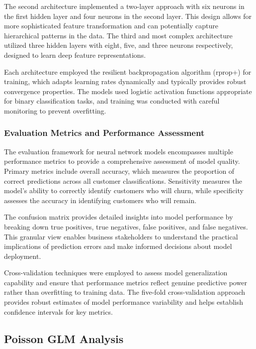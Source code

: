 \documentclass[
]{article}
\begin{document}
The second architecture implemented a two-layer approach with six
neurons in the first hidden layer and four neurons in the second layer.
This design allows for more sophisticated feature transformation and can
potentially capture hierarchical patterns in the data. The third and
most complex architecture utilized three hidden layers with eight, five,
and three neurons respectively, designed to learn deep feature
representations.

Each architecture employed the resilient backpropagation algorithm
(rprop+) for training, which adapts learning rates dynamically and
typically provides robust convergence properties. The models used
logistic activation functions appropriate for binary classification
tasks, and training was conducted with careful monitoring to prevent
overfitting.

\hypertarget{evaluation-metrics-and-performance-assessment}{%
\subsubsection{Evaluation Metrics and Performance
Assessment}\label{evaluation-metrics-and-performance-assessment}}

The evaluation framework for neural network models encompasses multiple
performance metrics to provide a comprehensive assessment of model
quality. Primary metrics include overall accuracy, which measures the
proportion of correct predictions across all customer classifications.
Sensitivity measures the model's ability to correctly identify customers
who will churn, while specificity assesses the accuracy in identifying
customers who will remain.

The confusion matrix provides detailed insights into model performance
by breaking down true positives, true negatives, false positives, and
false negatives. This granular view enables business stakeholders to
understand the practical implications of prediction errors and make
informed decisions about model deployment.

Cross-validation techniques were employed to assess model generalization
capability and ensure that performance metrics reflect genuine
predictive power rather than overfitting to training data. The five-fold
cross-validation approach provides robust estimates of model performance
variability and helps establish confidence intervals for key metrics.

\hypertarget{poisson-glm-analysis}{%
\subsection{Poisson GLM Analysis}\label{poisson-glm-analysis}}
\end{document}
